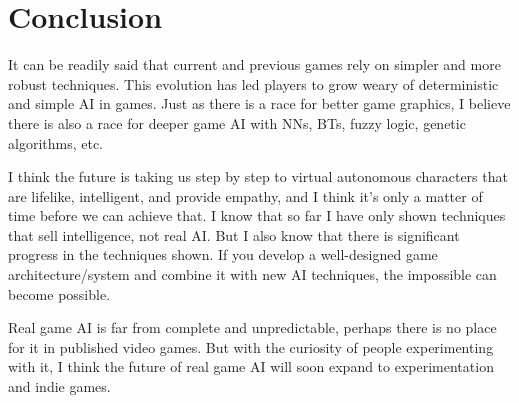 \documentclass[a4paper,12pt,openright]{book}
\begin{document}
\chapter {Conclusion}
\label{ch4}

It can be readily said that current and previous games rely on simpler and more robust techniques. This evolution has led players to grow weary of deterministic and simple AI in games. Just as there is a race for better game graphics, I believe there is also a race for deeper game AI with NNs, BTs, fuzzy logic, genetic algorithms, etc. 

I think the future is taking us step by step to virtual autonomous characters that are lifelike, intelligent, and provide empathy, and I think it's only a matter of time before we can achieve that. I know that so far I have only shown techniques that sell intelligence, not real AI. But I also know that there is significant progress in the techniques shown. If you develop a well-designed game architecture/system and combine it with new AI techniques, the impossible can become possible.

Real game AI is far from complete and unpredictable, perhaps there is no place for it in published video games. But with the curiosity of people experimenting with it, I think the future of real game AI will soon expand to experimentation and indie games.

\cleardoublepage

\printbibliography[heading=bibintoc,type=article,title={Journal articles}]
\printbibliography[heading=bibintoc,type=inproceedings,title={Articles in proceedings}]

\printbibliography[heading=bibintoc,type=incollection,title={Chapters in books}]

\printbibliography[heading=bibintoc,title={Literature}]
\end{document}
